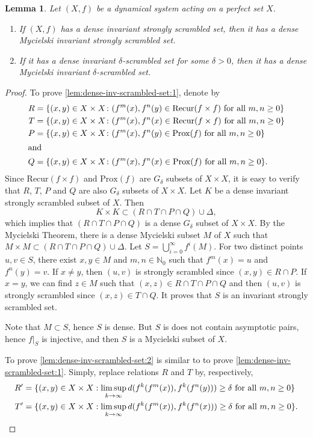 \documentclass[reqno,a4paper,12pt]{amsart}
\newtheorem{lem}[thm]{Lemma}
\theoremstyle{definition}
\numberwithin{equation}{section}
\begin{document}
\begin{lem}\label{lem:dense-inv-scrambled-set}
Let $(X,f)$ be a dynamical system acting on a perfect set $X$.
\begin{enumerate}
\item If $(X,f)$ has a dense invariant strongly scrambled set,
then it has a dense Mycielski invariant strongly scrambled set.\label{lem:dense-inv-scrambled-set:1}
\item If it has a dense invariant $\delta$-scrambled set for some $\delta>0$,
then it has a dense Mycielski invariant $\delta$-scrambled set.\label{lem:dense-inv-scrambled-set:2}
\end{enumerate}
\end{lem}
\begin{proof}
To prove \eqref{lem:dense-inv-scrambled-set:1}, denote by
\begin{align*}
  R&=\{(x,y)\in X\times X\colon (f^m(x),f^n(y)\in\mathrm{Recur}(f\times f) \text{ for all } m,n\geq 0\}\\
  T&=\{(x,y)\in X\times X\colon (f^m(x),f^n(x)\in\mathrm{Recur}(f\times f) \text{ for all } m,n\geq 0\}\\
  P&=\{(x,y)\in X\times X\colon (f^m(x),f^n(y)\in\mathrm{Prox}(f) \text{ for all } m,n\geq 0\}\\
\intertext{and}
  Q&=\{(x,y)\in X\times X\colon (f^m(x),f^n(x)\in\mathrm{Prox}(f) \text{ for all } m,n\geq 0\}.
\end{align*}
Since $\mathrm{Recur}(f\times f)$ and $\mathrm{Prox}(f)$ are $G_\delta$ subsets of $X\times X$,
it is easy to verify that $R$, $T$, $P$ and $Q$ are also $G_\delta$ subsets of $X\times X$.
Let $K$ be a dense invariant strongly scrambled subset of $X$.
Then
\[K\times K\subset (R\cap T\cap P\cap Q)\cup \Delta,\]
which implies that
$(R\cap T\cap P\cap Q)$ is a dense $G_\delta$ subset of $X\times X$.
By the Mycielski Theorem, there is a dense Mycielski subset $M$ of $X$ such that
$M \times M\subset (R\cap T\cap P\cap Q)\cup \Delta$.
Let $S=\bigcup_{i=0}^\infty f^i(M)$.
For two distinct points $u,v\in S$, there exist $x,y\in M$ and $m,n\in{\mathbb{N}}_0$ such that
$f^m(x)=u$ and $f^n(y)=v$.
If $x\neq y$, then $(u,v)$ is strongly scrambled since $(x,y)\in R\cap P$.
If $x=y$, we can find $z\in M$ such that $(x,z)\in R\cap T\cap P\cap Q$ and
then $(u,v)$ is strongly scrambled since $(x,z)\in T\cap Q$.
It proves that $S$ is an invariant  strongly scrambled set.

Note that $M\subset S$, hence $S$ is dense. But $S$ is does not contain asymptotic pairs, hence
$f|_S$ is injective,
and then $S$ is a Mycielski subset of $X$.

To prove \eqref{lem:dense-inv-scrambled-set:2}
is similar to to prove \eqref{lem:dense-inv-scrambled-set:1}. Simply, replace relations $R$ and $T$ by, respectively,
\begin{align*}
R'&=\{(x,y)\in X\times X: \limsup_{k\to\infty} d(f^k(f^m(x)),f^k(f^n(y)))\geq \delta\text{ for all } m,n\geq 0\}\\
T'&=\{(x,y)\in X\times X: \limsup_{k\to\infty} d(f^k(f^m(x)),f^k(f^n(x)))\geq \delta\text{ for all } m,n\geq 0\}. \qedhere
\end{align*}
\end{proof}
\end{document}
